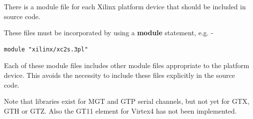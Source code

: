 \pagebreak


    There is a module file for each Xilinx platform device that should
    be included in source code.

    These files must be incorporated by using a {\bf module} statement,
    e.g. -
    \begin{lstlisting}[gobble=4, language=threepl]
       module "xilinx/xc2s.3pl"
    \end{lstlisting}
    
    Each of these module files includes other module files appropriate
    to the platform device. This avoids the necessity to include these
    files explicitly in the source code.
    
    Note that libraries exist for MGT and GTP serial channels, but not yet
    for GTX, GTH or GTZ. Also the GT11 element for Virtex4 has not been
    implemented.

